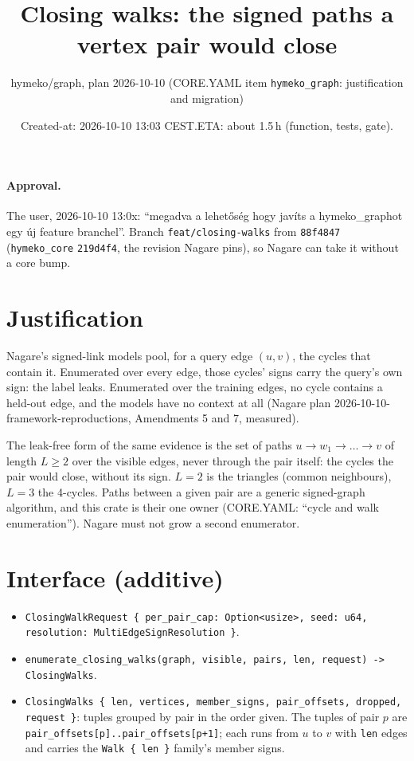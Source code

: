 \documentclass[10pt]{article}
\title{Closing walks: the signed paths a vertex pair would close}
\author{hymeko/graph, plan 2026-10-10 (CORE.YAML item \texttt{hymeko\_graph}: justification and migration)}
\date{Created-at: 2026-10-10 13:03 CEST.\quad ETA: about 1.5\,h (function, tests, gate).}
\begin{document}
\maketitle

\paragraph{Approval.} The user, 2026-10-10 13:0x: ``megadva a lehet\H{o}s\'eg hogy jav\'its a hymeko\_graphot egy
\'uj feature branchel''. Branch \texttt{feat/closing-walks} from \texttt{88f4847} (\texttt{hymeko\_core}
\texttt{219d4f4}, the revision Nagare pins), so Nagare can take it without a core bump.

\section*{Justification}
Nagare's signed-link models pool, for a query edge $(u,v)$, the cycles that contain it. Enumerated over every edge,
those cycles' signs carry the query's own sign: the label leaks. Enumerated over the training edges, no cycle
contains a held-out edge, and the models have no context at all (Nagare plan 2026-10-10-framework-reproductions,
Amendments 5 and 7, measured).

The leak-free form of the same evidence is the set of paths $u\to w_1\to\dots\to v$ of length $L\ge2$ over the visible
edges, never through the pair itself: the cycles the pair would close, without its sign. $L=2$ is the triangles
(common neighbours), $L=3$ the 4-cycles. Paths between a given pair are a generic signed-graph algorithm, and this
crate is their one owner (CORE.YAML: ``cycle and walk enumeration''). Nagare must not grow a second enumerator.

\section*{Interface (additive)}
\begin{itemize}
\item \texttt{ClosingWalkRequest \{ per\_pair\_cap: Option<usize>, seed: u64, resolution:
  MultiEdgeSignResolution \}}.
\item \texttt{enumerate\_closing\_walks(graph, visible, pairs, len, request) -> ClosingWalks}.
\item \texttt{ClosingWalks \{ len, vertices, member\_signs, pair\_offsets, dropped, request \}}: tuples grouped
  by pair in the order given. The tuples of pair $p$ are \texttt{pair\_offsets[p]..pair\_offsets[p+1]}; each runs
  from $u$ to $v$ with \texttt{len} edges and carries the \texttt{Walk \{ len \}} family's member signs.
\end{itemize}
\end{document}

